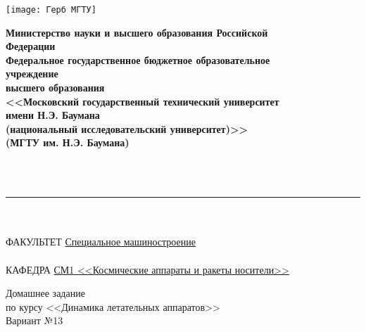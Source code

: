 \begin{minipage}{0.2\linewidth}
    \texttt{[image: Герб МГТУ]}
\end{minipage}
\begin{minipage}{0.8\linewidth}
    \begin{center}
        \begin{singlespace}
            \textbf{Министерство науки и высшего образования Российской \\ Федерации \\ Федеральное государственное бюджетное образовательное \\ учреждение \\ высшего образования \\ <<Московский государственный технический университет \\ имени Н.Э. Баумана \\ (национальный исследовательский университет)>> \\ (МГТУ им. Н.Э. Баумана)}
        \end{singlespace}
    \end{center}
\end{minipage}
\\
\\
\rule{\linewidth}{2pt} %
\\
\\
ФАКУЛЬТЕТ \underline{\hspace{0.25\linewidth} Специальное машиностроение \hspace{0.25\linewidth}}
\\
\\
КАФЕДРА \underline{\hspace{0.16\linewidth} СМ1 <<Космические аппараты и ракеты носители>> \hspace{0.16\linewidth}}
\\
\vspace{3.5cm}
\begin{center}
    \begin{minipage}{0.8\linewidth}
        \begin{center}
            \large Домашнее задание \\ по курсу <<Динамика летательных аппаратов>>
            \\[10pt]
            \large Вариант №13
        \end{center}
    \end{minipage}
\end{center}

